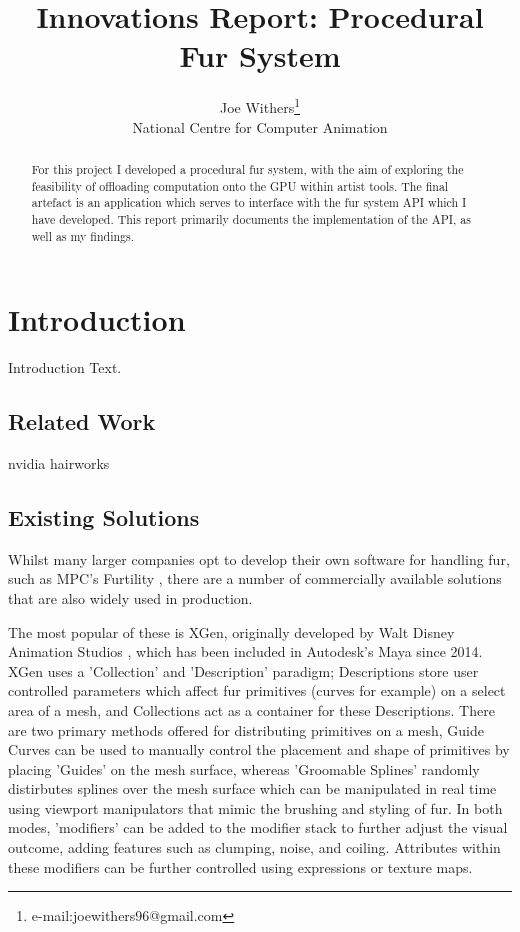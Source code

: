 \documentclass[]{acmsiggraph}
\title{Innovations Report: Procedural Fur System}
\author{Joe Withers\thanks{e-mail:joewithers96@gmail.com}\\National Centre for Computer Animation}
\begin{document}
\maketitle

\begin{abstract}
For this project I developed a procedural fur system, with the aim of exploring the feasibility of offloading computation onto the GPU within artist tools. The final artefact is an application which serves to interface with the fur system API which I have developed. This report primarily documents the implementation of the API, as well as my findings.
\end{abstract}

\section{Introduction} \label{sec:introduction}
Introduction Text.
\subsection{Related Work} \label{sec:related}
nvidia hairworks

\subsection{Existing Solutions} \label{sec:existing}
Whilst many larger companies opt to develop their own software for handling fur, such as MPC's Furtility \cite{furtility}, there are a number of commercially available solutions that are also widely used in production.

The most popular of these is XGen, originally developed by Walt Disney Animation Studios \cite{xgen}, which has been included in Autodesk's Maya since 2014. XGen uses a 'Collection' and 'Description' paradigm; Descriptions store user controlled parameters which affect fur primitives (curves for example) on a select area of a mesh, and Collections act as a container for these Descriptions. There are two primary methods offered for distributing primitives on a mesh, Guide Curves can be used to manually control the placement and shape of primitives by placing 'Guides' on the mesh surface, whereas 'Groomable Splines' randomly distirbutes splines over the mesh surface which can be manipulated in real time using viewport manipulators that mimic the brushing and styling of fur. In both modes, 'modifiers' can be added to the modifier stack to further adjust the visual outcome, adding features such as clumping, noise, and coiling. Attributes within these modifiers can be further controlled using expressions or texture maps.
\end{document}
